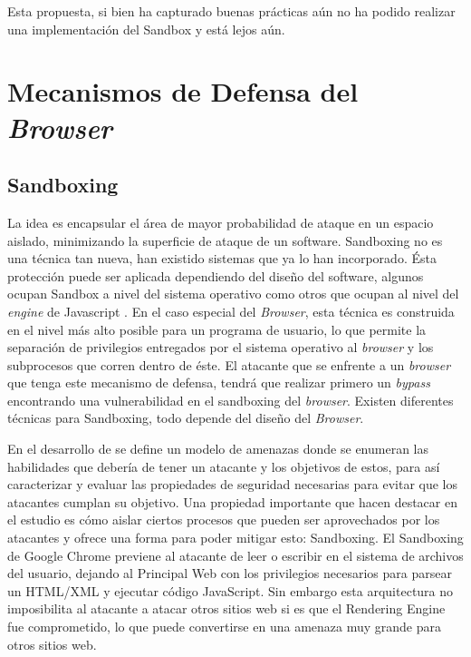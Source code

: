     Esta propuesta, si bien ha capturado buenas prácticas aún no ha podido realizar una implementación del Sandbox y está lejos aún.



\section{Mecanismos de Defensa del \textit{Browser}}

\subsection{Sandboxing}
    \label{chap3:Sandboxing}
    La idea es encapsular el área de mayor probabilidad de ataque en un espacio aislado, minimizando la superficie de ataque de un software. Sandboxing no es una técnica tan nueva, han existido sistemas que ya lo han incorporado. Ésta protección puede ser aplicada dependiendo del diseño del software, algunos ocupan Sandbox a nivel del sistema operativo como otros que ocupan al nivel del \textit{engine} de Javascript \cite{reis2009browser}. En el caso especial del \textit{Browser}, esta técnica es construida en el nivel más alto posible para un programa de usuario, lo que permite la separación de privilegios entregados por el sistema operativo al \textit{browser} y los subprocesos que corren dentro de éste. El atacante que se enfrente a un \textit{browser} que tenga este mecanismo de defensa, tendrá que realizar primero un \textit{bypass} encontrando una vulnerabilidad en el sandboxing del \textit{browser}. Existen diferentes técnicas para Sandboxing, todo depende del diseño del \textit{Browser}.

    En el desarrollo de \cite{barth2008security} se define un modelo de amenazas donde se enumeran las habilidades que debería de tener un atacante y los objetivos de estos, para así caracterizar y evaluar las propiedades de seguridad necesarias para evitar que los atacantes cumplan su objetivo. Una propiedad importante que hacen destacar en el estudio es cómo aislar ciertos procesos que pueden ser aprovechados por los atacantes y ofrece una forma para poder mitigar esto: Sandboxing. El Sandboxing de Google Chrome previene al atacante de leer o escribir en el sistema de archivos del usuario, dejando al Principal Web con los privilegios necesarios para parsear un HTML/XML y ejecutar código JavaScript. Sin embargo esta arquitectura no imposibilita al atacante a atacar otros sitios web si es que el Rendering Engine fue comprometido, lo que puede convertirse en una amenaza muy grande para otros sitios web.

